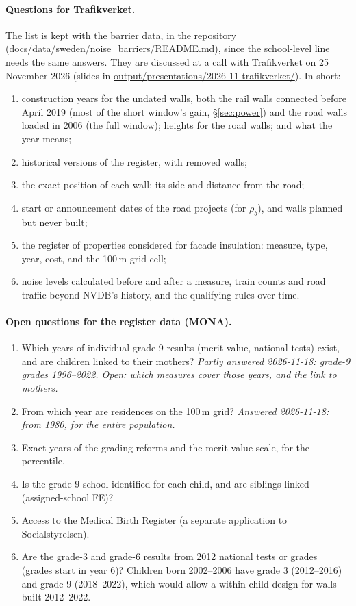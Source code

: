 \documentclass[11pt]{article}
\begin{document}
\paragraph{Questions for Trafikverket.} The list is kept with the barrier data, in the
repository (\url{docs/data/sweden/noise_barriers/README.md}), since the school-level line
needs the same answers. They are discussed at a call with Trafikverket on 25 November 2026
(slides in \url{output/presentations/2026-11-trafikverket/}). In short:
\begin{enumerate}
\item construction years for the undated walls, both the rail walls connected before April 2019
  (most of the short window's gain, \S\ref{sec:power}) and the road walls loaded in 2006 (the
  full window); heights for the road walls; and what the year means;
\item historical versions of the register, with removed walls;
\item the exact position of each wall: its side and distance from the road;
\item start or announcement dates of the road projects (for \(\rho_b\)), and walls planned but
  never built;
\item the register of properties considered for facade insulation: measure, type, year, cost,
  and the 100\,m grid cell;
\item noise levels calculated before and after a measure, train counts and road traffic beyond
  NVDB's history, and the qualifying rules over time.
\end{enumerate}

\paragraph{Open questions for the register data (MONA).}
\begin{enumerate}
\item Which years of individual grade-9 results (merit value, national tests) exist, and are
  children linked to their mothers? \emph{Partly answered 2026-11-18: grade-9 grades
  1996--2022. Open: which measures cover those years, and the link to mothers.}
\item From which year are residences on the 100\,m grid? \emph{Answered 2026-11-18: from 1980,
  for the entire population.}
\item Exact years of the grading reforms and the merit-value scale, for the percentile.
\item Is the grade-9 school identified for each child, and are siblings linked (assigned-school
  FE)?
\item Access to the Medical Birth Register (a separate application to Socialstyrelsen).
\item Are the grade-3 and grade-6 results from 2012 national tests or grades (grades start in
  year 6)? Children born 2002--2006 have grade 3 (2012--2016) and grade 9 (2018--2022), which
  would allow a within-child design for walls built 2012--2022.
\end{enumerate}
\end{document}
